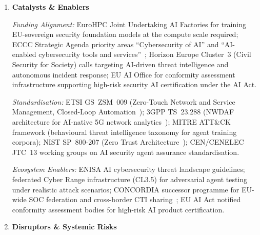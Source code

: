 \begin{enumerate}
\item \textbf{Catalysts \& Enablers}

\textit{Funding Alignment:}
EuroHPC Joint Undertaking AI Factories for training EU-sovereign security foundation
models at the compute scale required; ECCC Strategic Agenda priority areas ``Cybersecurity
of AI'' and ``AI-enabled cybersecurity tools and services''~\cite{eccc}; Horizon Europe
Cluster~3 (Civil Security for Society) calls targeting AI-driven threat intelligence and
autonomous incident response; EU AI Office for conformity assessment infrastructure
supporting high-risk security AI certification under the AI Act.

\textit{Standardisation:}
ETSI GS~ZSM~009 (Zero-Touch Network and Service Management, Closed-Loop
Automation~\cite{etsizsm009}); 3GPP TS~23.288 (NWDAF architecture for AI-native 5G
network analytics~\cite{threeGPP23288}); MITRE ATT\&CK framework (behavioural threat
intelligence taxonomy for agent training corpora); NIST SP~800-207 (Zero Trust
Architecture~\cite{nistsp800207}); CEN/CENELEC JTC~13 working groups on AI security
agent assurance standardisation.

\textit{Ecosystem Enablers:}
ENISA AI cybersecurity threat landscape guidelines; federated Cyber Range infrastructure
(CL3.5) for adversarial agent testing under realistic attack scenarios; CONCORDIA
successor programme for EU-wide SOC federation and cross-border CTI sharing~\cite{concordia};
EU AI Act notified conformity assessment bodies for high-risk AI product certification.

\item \textbf{Disruptors \& Systemic Risks}


\end{enumerate}
